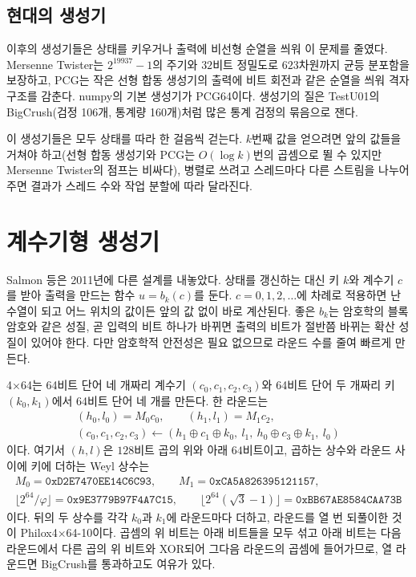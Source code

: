 \subsection{현대의 생성기}

이후의 생성기들은 상태를 키우거나 출력에 비선형 순열을 씌워 이 문제를 줄였다. Mersenne Twister는 $2^{19937}-1$의 주기와 $32$비트 정밀도로 $623$차원까지 균등 분포함을 보장하고\cite{matsumoto1998}, PCG는 작은 선형 합동 생성기의 출력에 비트 회전과 같은 순열을 씌워 격자 구조를 감춘다\cite{oneill2014pcg}. numpy의 기본 생성기가 PCG64이다. 생성기의 질은 TestU01의 BigCrush(검정 106개, 통계량 160개)처럼 많은 통계 검정의 묶음으로 잰다\cite{lecuyer2007}.

이 생성기들은 모두 상태를 따라 한 걸음씩 걷는다. $k$번째 값을 얻으려면 앞의 값들을 거쳐야 하고(선형 합동 생성기와 PCG는 $O(\log k)$번의 곱셈으로 뛸 수 있지만 Mersenne Twister의 점프는 비싸다), 병렬로 쓰려고 스레드마다 다른 스트림을 나누어 주면 결과가 스레드 수와 작업 분할에 따라 달라진다.

\section{계수기형 생성기}
\label{sec:counter-based}

Salmon 등은 2011년에 다른 설계를 내놓았다\cite{salmon2011random123}. 상태를 갱신하는 대신 키 $k$와 계수기 $c$를 받아 출력을 만드는 함수 $u=b_k(c)$를 둔다. $c=0,1,2,\dots$에 차례로 적용하면 난수열이 되고 어느 위치의 값이든 앞의 값 없이 바로 계산된다. 좋은 $b_k$는 암호학의 블록 암호와 같은 성질, 곧 입력의 비트 하나가 바뀌면 출력의 비트가 절반쯤 바뀌는 확산 성질이 있어야 한다. 다만 암호학적 안전성은 필요 없으므로 라운드 수를 줄여 빠르게 만든다.

4×64는 64비트 단어 네 개짜리 계수기 $(c_0,c_1,c_2,c_3)$와 64비트 단어 두 개짜리 키 $(k_0,k_1)$에서 64비트 단어 네 개를 만든다. 한 라운드는
\begin{gather*}
(h_0,l_0)=M_0c_0,\qquad(h_1,l_1)=M_1c_2,\\
(c_0,c_1,c_2,c_3)\gets(h_1\oplus c_1\oplus k_0,\ l_1,\ h_0\oplus c_3\oplus k_1,\ l_0)
\end{gather*}
이다. 여기서 $(h,l)$은 $128$비트 곱의 위와 아래 $64$비트이고, 곱하는 상수와 라운드 사이에 키에 더하는 Weyl 상수는
\begin{gather*}
M_0=\texttt{0xD2E7470EE14C6C93},\qquad M_1=\texttt{0xCA5A826395121157},\\
\lfloor2^{64}/\varphi\rfloor=\texttt{0x9E3779B97F4A7C15},\qquad\lfloor2^{64}(\sqrt3-1)\rfloor=\texttt{0xBB67AE8584CAA73B}
\end{gather*}
이다. 뒤의 두 상수를 각각 $k_0$과 $k_1$에 라운드마다 더하고, 라운드를 열 번 되풀이한 것이 Philox4×64-10이다. 곱셈의 위 비트는 아래 비트들을 모두 섞고 아래 비트는 다음 라운드에서 다른 곱의 위 비트와 XOR되어 그다음 라운드의 곱셈에 들어가므로, 열 라운드면 BigCrush를 통과하고도 여유가 있다.


